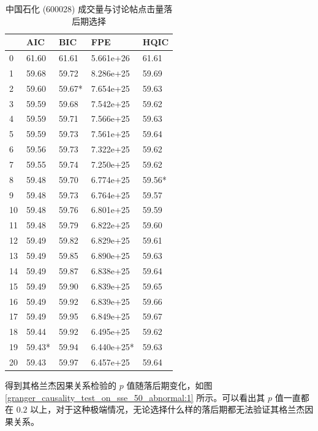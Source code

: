 \begin{table}
  \centering
  \caption{中国石化 (600028) 成交量与讨论帖点击量落后期选择}
  \label{granger_causality_test_on_sse_50_abnormal:0}
  \begin{tabularx}{0.75\textwidth}{XXXXX}
    \toprule
    & AIC & BIC & FPE & HQIC \\
    \midrule
      0 & 61.60 & 61.61 & 5.661e+26 & 61.61 \\
      1 & 59.68 & 59.72 & 8.286e+25 & 59.69 \\
      2 & 59.60 & 59.67* & 7.654e+25 & 59.63 \\
      3 & 59.59 & 59.68 & 7.542e+25 & 59.62 \\
      4 & 59.59 & 59.71 & 7.566e+25 & 59.63 \\
      5 & 59.59 & 59.73 & 7.561e+25 & 59.64 \\
      6 & 59.56 & 59.73 & 7.322e+25 & 59.62 \\
      7 & 59.55 & 59.74 & 7.250e+25 & 59.62 \\
      8 & 59.48 & 59.70 & 6.774e+25 & 59.56* \\
      9 & 59.48 & 59.73 & 6.764e+25 & 59.57 \\
      10 & 59.48 & 59.76 & 6.801e+25 & 59.59 \\
      11 & 59.48 & 59.79 & 6.822e+25 & 59.60 \\
      12 & 59.49 & 59.82 & 6.829e+25 & 59.61 \\
      13 & 59.49 & 59.85 & 6.890e+25 & 59.63 \\
      14 & 59.49 & 59.87 & 6.838e+25 & 59.64 \\
      15 & 59.49 & 59.90 & 6.839e+25 & 59.65 \\
      16 & 59.49 & 59.92 & 6.839e+25 & 59.66 \\
      17 & 59.49 & 59.95 & 6.849e+25 & 59.67 \\
      18 & 59.44 & 59.92 & 6.495e+25 & 59.62 \\
      19 & 59.43* & 59.94 & 6.440e+25* & 59.63 \\
      20 & 59.43 & 59.97 & 6.457e+25 & 59.64 \\
    \bottomrule
  \end{tabularx}
\end{table}

得到其格兰杰因果关系检验的 $p$ 值随落后期变化，如图 \ref{granger_causality_test_on_sse_50_abnormal:1} 所示。可以看出其 $p$ 值一直都在 $0.2$ 以上，对于这种极端情况，无论选择什么样的落后期都无法验证其格兰杰因果关系。


